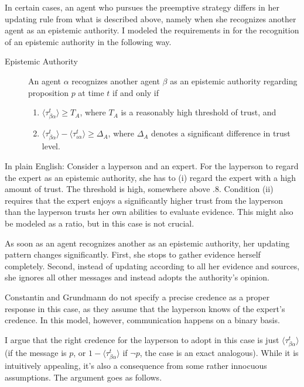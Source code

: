 \documentclass[11pt, a4paper]{article}
\begin{document}
In certain cases, an agent who pursues the preemptive strategy differs in her updating rule from what is described above, namely when she recognizes another agent as an epistemic authority. I modeled the requirements in \textcite[p.9]{Constantin2017} for the recognition of an epistemic authority in the following way. 
\begin{description} 
    \item[Epistemic Authority] An agent $\alpha$ recognizes another agent $\beta$ as an epistemic authority regarding proposition $p$ at time $t$ if and only if  
    \begin{enumerate}[label= (\roman*)]
        \item $\langle \tau^t_{\beta\alpha} \rangle \geqslant T_A$, where $T_A$ is a reasonably high threshold of trust, and
        \item $\langle \tau^t_{\beta\alpha} \rangle - \langle \tau^t_{\iota\alpha} \rangle \geqslant \Delta_A$, where $\Delta_A$ denotes a significant difference in trust level.
    \end{enumerate}


\end{description}
    In plain English: Consider a layperson and an expert. For the layperson to regard the expert as an epistemic authority, she has to (i) regard the expert with a high amount of trust. The threshold is high, somewhere above $.8$. Condition (ii) requires that the expert enjoys a significantly higher trust from the layperson than the layperson trusts her own abilities to evaluate evidence. This might also be modeled as a ratio, but in this case is not crucial.

As soon as an agent recognizes another as an epistemic authority, her updating pattern changes significantly. First, she stops to gather evidence herself completely. Second, instead of updating according to all her evidence and sources, she ignores all other messages and instead adopts the authority's opinion.

Constantin and Grundmann do not specify a precise credence as a proper response in this case, as they assume that the layperson knows of the expert's credence. In this model, however, communication happens on a binary basis.
 
I argue that the right credence for the layperson to adopt in this case is just $\langle \tau^t_{\beta\alpha} \rangle$ (if the message is $p$, or $1 - \langle \tau^t_{\beta\alpha} \rangle$ if $\neg p$, the case is an exact analogous). While it is intuitively appealing, it's also a consequence from some rather innocuous assumptions. The argument goes as follows. 
\end{document}
